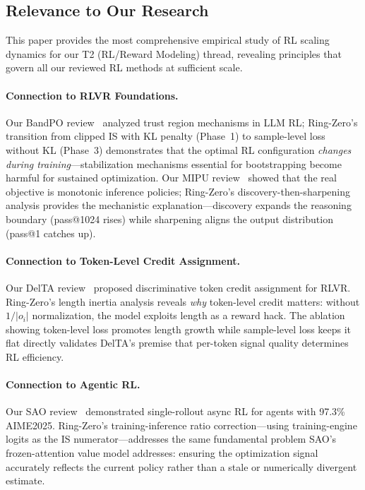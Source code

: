 \documentclass[11pt,a4paper]{article}
\begin{document}
\subsection{Relevance to Our Research}

This paper provides the most comprehensive empirical study of RL scaling dynamics for our T2 (RL/Reward Modeling) thread, revealing principles that govern all our reviewed RL methods at sufficient scale.

\paragraph{Connection to RLVR Foundations.} Our BandPO review~\cite{bandpo2026} analyzed trust region mechanisms in LLM RL; Ring-Zero's transition from clipped IS with KL penalty (Phase~1) to sample-level loss without KL (Phase~3) demonstrates that the optimal RL configuration \emph{changes during training}---stabilization mechanisms essential for bootstrapping become harmful for sustained optimization. Our MIPU review~\cite{mirage2026} showed that the real objective is monotonic inference policies; Ring-Zero's discovery-then-sharpening analysis provides the mechanistic explanation---discovery expands the reasoning boundary (pass@1024 rises) while sharpening aligns the output distribution (pass@1 catches up).

\paragraph{Connection to Token-Level Credit Assignment.} Our DelTA review~\cite{delta2026} proposed discriminative token credit assignment for RLVR. Ring-Zero's length inertia analysis reveals \emph{why} token-level credit matters: without $1/|o_i|$ normalization, the model exploits length as a reward hack. The ablation showing token-level loss promotes length growth while sample-level loss keeps it flat directly validates DelTA's premise that per-token signal quality determines RL efficiency.

\paragraph{Connection to Agentic RL.} Our SAO review~\cite{sao2026} demonstrated single-rollout async RL for agents with 97.3\% AIME2025. Ring-Zero's training-inference ratio correction---using training-engine logits as the IS numerator---addresses the same fundamental problem SAO's frozen-attention value model addresses: ensuring the optimization signal accurately reflects the current policy rather than a stale or numerically divergent estimate.
\end{document}
